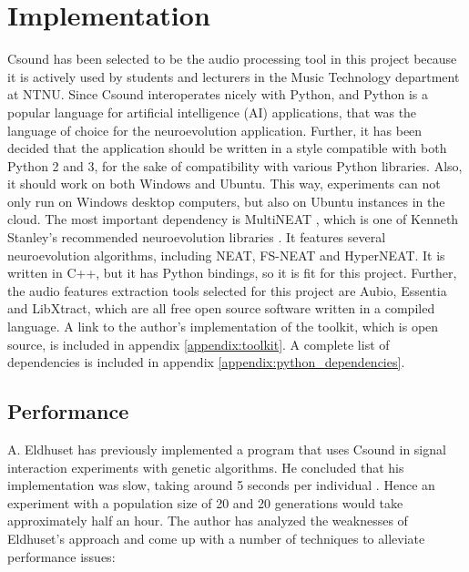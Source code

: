 \section{Implementation}
Csound has been selected to be the audio processing tool in this project because it is actively used by students and lecturers in the Music Technology department at NTNU. Since Csound interoperates nicely with Python, and Python is a popular language for artificial intelligence (AI) applications, that was the language of choice for the neuroevolution application. Further, it has been decided that the application should be written in a style compatible with both Python 2 and 3, for the sake of compatibility with various Python libraries. Also, it should work on both Windows and Ubuntu. This way, experiments can not only run on Windows desktop computers, but also on Ubuntu instances in the cloud. The most important dependency is MultiNEAT \citep{multineat}, which is one of Kenneth Stanley’s recommended neuroevolution libraries \citep{neatsoftware}. It features several neuroevolution algorithms, including NEAT, FS-NEAT and HyperNEAT. It is written in C++, but it has Python bindings, so it is fit for this project. Further, the audio features extraction tools selected for this project are Aubio, Essentia and LibXtract, which are all free open source software written in a compiled language. A link to the author’s implementation of the toolkit, which is open source, is included in appendix \ref{appendix:toolkit}. A complete list of dependencies is included in appendix \ref{appendix:python_dependencies}.

\subsection{Performance}
A. Eldhuset has previously implemented a program that uses Csound in signal interaction experiments with genetic algorithms. He concluded that his implementation was slow, taking around 5 seconds per individual \citep{eldhuset2015}. Hence an experiment with a population size of 20 and 20 generations would take approximately half an hour. The author has analyzed the weaknesses of Eldhuset's approach and come up with a number of techniques to alleviate performance issues:

